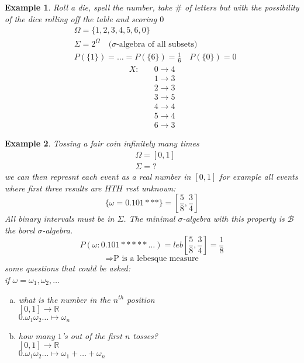 \documentclass[12pt]{article}
\def\RR{\mathbb{R}}
\newtheorem{example}{Example}[section]
\begin{document}
\begin{example}
Roll a die, spell the number, take $\#$ of letters but with the possibility of the dice rolling off the table and scoring $0$
\begin{align*}
&\Omega = \{1,2,3,4,5,6,0\}\\
&\Sigma = 2^{\Omega} \quad \text{($\sigma$-algebra of all subsets)}\\
&P(\{1\})= \dots =P(\{6\}) = \frac{1}{6} \quad 
P(\{0\}) = 0
\end{align*}
\begin{align*}
X:\quad  &0\rightarrow 4\\
&1\rightarrow 3\\
&2\rightarrow 3\\
&3\rightarrow 5\\
&4\rightarrow 4\\
&5\rightarrow 4\\
&6\rightarrow 3
\end{align*}
\end{example}

\begin{example}
Tossing a fair coin infinitely many times
\begin{align*}
&\Omega = [0,1]\\
&\Sigma = ?
\end{align*}
we can then represnt each event as a real number in $[0,1]$ for example all events where first three results are $HTH$ rest unknown:
\[\{\omega = 0.101***\} = \left[\frac{5}{8} , \frac{3}{4}\right] \]
All binary intervals must be in $\Sigma$. The minimal $\sigma$-algebra with this property is $\mathcal{B}$ the borel $\sigma$-algebra. 
\[P(\omega : 0.101*****\dots ) = leb\left[\frac{5}{8}, \frac{3}{4}\right] = \frac{1}{8}\]
\[\Rightarrow \text{P is a lebesque measure}\]
some questions that could be asked:\\
if $\omega = \omega_1, \omega_2 , \dots$
\begin{enumerate}[(a)]
\item what is the number in the $n^{th}$ position\\
$[0,1] \rightarrow \RR$\\
$0.\omega_1 \omega_2 \dots \mapsto  \omega_n$
\item how many $1$'s out of the first $n$ tosses?\\
$[0,1] \rightarrow \RR$\\
$0.\omega_1 \omega_2 \dots \mapsto \omega_1 + \dots + \omega_n$
\end{enumerate}
\end{example}
\end{document}
